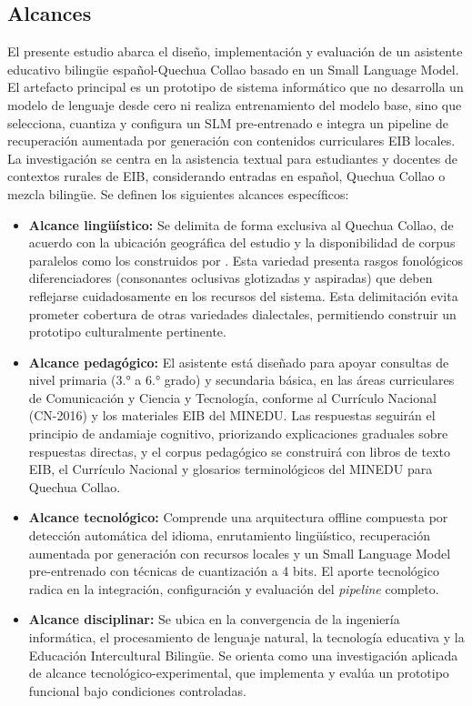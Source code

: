 \subsection{Alcances}
El presente estudio abarca el diseño, implementación y evaluación de un asistente educativo bilingüe español-Quechua Collao basado en un Small Language Model. El artefacto principal es un prototipo de sistema informático que no desarrolla un modelo de lenguaje desde cero ni realiza entrenamiento del modelo base, sino que selecciona, cuantiza y configura un SLM pre-entrenado e integra un pipeline de recuperación aumentada por generación con contenidos curriculares EIB locales. La investigación se centra en la asistencia textual para estudiantes y docentes de contextos rurales de EIB, considerando entradas en español, Quechua Collao o mezcla bilingüe. Se definen los siguientes alcances específicos:

\begin{itemize}
	\item \textbf{Alcance lingüístico:} Se delimita de forma exclusiva al Quechua Collao, de acuerdo con la ubicación geográfica del estudio y la disponibilidad de corpus paralelos como los construidos por \citet{Orcotoma2025}. Esta variedad presenta rasgos fonológicos diferenciadores (consonantes oclusivas glotizadas y aspiradas) que deben reflejarse cuidadosamente en los recursos del sistema. Esta delimitación evita prometer cobertura de otras variedades dialectales, permitiendo construir un prototipo culturalmente pertinente.

	\item \textbf{Alcance pedagógico:} El asistente está diseñado para apoyar consultas de nivel primaria (3.° a 6.° grado) y secundaria básica, en las áreas curriculares de Comunicación y Ciencia y Tecnología, conforme al Currículo Nacional (CN-2016) y los materiales EIB del MINEDU. Las respuestas seguirán el principio de andamiaje cognitivo, priorizando explicaciones graduales sobre respuestas directas, y el corpus pedagógico se construirá con libros de texto EIB, el Currículo Nacional y glosarios terminológicos del MINEDU para Quechua Collao.

	\item \textbf{Alcance tecnológico:} Comprende una arquitectura offline compuesta por detección automática del idioma, enrutamiento lingüístico, recuperación aumentada por generación con recursos locales y un Small Language Model pre-entrenado con técnicas de cuantización a 4 bits. El aporte tecnológico radica en la integración, configuración y evaluación del \textit{pipeline} completo.

	\item \textbf{Alcance disciplinar:} Se ubica en la convergencia de la ingeniería informática, el procesamiento de lenguaje natural, la tecnología educativa y la Educación Intercultural Bilingüe. Se orienta como una investigación aplicada de alcance tecnológico-experimental, que implementa y evalúa un prototipo funcional bajo condiciones controladas.
\end{itemize}

